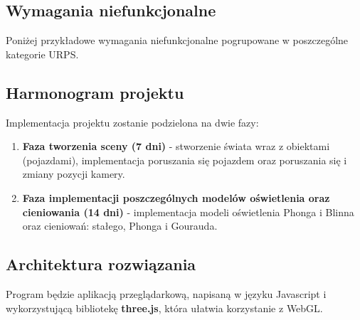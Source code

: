 \documentclass[11pt]{article}
\let\Oldsubsection\subsection
\renewcommand{\subsection}{\FloatBarrier\Oldsubsection}
\begin{document}
\subsection{Wymagania niefunkcjonalne}
Poniżej przykładowe wymagania niefunkcjonalne pogrupowane w poszczególne kategorie URPS.


\begin{center}

\begin{table}[!h]
\centering
\def\arraystretch{2}%
\caption{Lista wymagań niefunkcjonalnych}
\label{my-label}
\end{table}
\end{center}

\subsection{Harmonogram projektu}

\par Implementacja projektu zostanie podzielona na dwie fazy:
\begin{enumerate}
\item \textbf{Faza tworzenia sceny (7 dni)} - stworzenie świata wraz z obiektami (pojazdami), implementacja poruszania się pojazdem oraz poruszania się i zmiany pozycji kamery.
\item \textbf{Faza implementacji poszczególnych modelów oświetlenia oraz cieniowania (14 dni)} - implementacja modeli oświetlenia Phonga i Blinna oraz cieniowań: stałego, Phonga i Gourauda.
\end{enumerate}
\par \noindent

\subsection{Architektura rozwiązania}

\par Program będzie aplikacją przeglądarkową, napisaną w języku Javascript i wykorzystującą bibliotekę \textbf{three.js}, która ułatwia korzystanie z WebGL.
\end{document}
